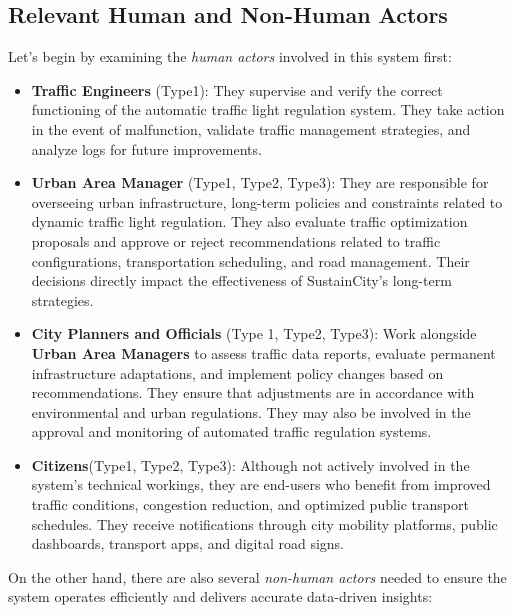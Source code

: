 \documentclass[a4paper,12pt]{article}
\begin{document}
\subsection{Relevant Human and Non-Human Actors}
Let's begin by examining the \textit{human actors} involved in this system first:
\begin{itemize}
    \item \textbf{Traffic Engineers} (Type1): They supervise and verify the correct functioning of the automatic traffic light regulation system. They take action in the event of malfunction, validate traffic management strategies, and analyze logs for future improvements.
    \item \textbf{Urban Area Manager} (Type1, Type2, Type3): They are responsible for overseeing urban infrastructure, long-term policies and constraints related to dynamic traffic light regulation. They also evaluate traffic optimization proposals and approve or reject recommendations related to traffic configurations, transportation scheduling, and road management. Their decisions directly impact the effectiveness of SustainCity's long-term strategies.
    \item \textbf{City Planners and Officials} (Type 1, Type2, Type3): Work alongside \textbf{Urban Area Managers} to assess traffic data reports, evaluate permanent infrastructure adaptations, and implement policy changes based on recommendations. They ensure that adjustments are in accordance with environmental and urban regulations. They may also be involved in the approval and monitoring of automated traffic regulation systems.
    \item \textbf{Citizens}(Type1, Type2, Type3): Although not actively involved in the system’s technical workings, they are end-users who benefit from improved traffic conditions, congestion reduction, and optimized public transport schedules. They receive notifications through city mobility platforms, public dashboards, transport apps, and digital road signs.
\end{itemize}
\noindent On the other hand, there are also several \textit{non-human actors} needed to ensure the system operates efficiently and delivers accurate data-driven insights:
\end{document}
